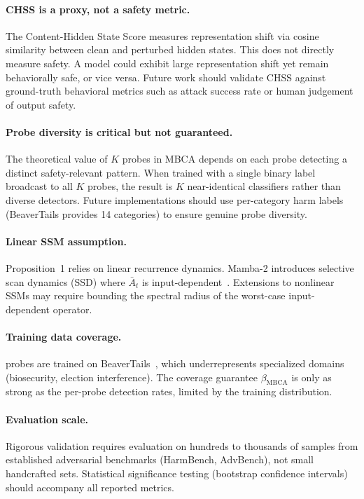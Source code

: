 \documentclass{article}
\newcommand{\MBCA}{\mathrm{MBCA}}
\newcommand{\betaMBCA}{\beta_{\MBCA}}
\begin{document}
\paragraph{CHSS is a proxy, not a safety metric.}
The Content-Hidden State Score measures representation shift via cosine similarity between clean and perturbed hidden states. This does not directly measure safety. A model could exhibit large representation shift yet remain behaviorally safe, or vice versa. Future work should validate CHSS against ground-truth behavioral metrics such as attack success rate or human judgement of output safety.

\paragraph{Probe diversity is critical but not guaranteed.}
The theoretical value of $K$ probes in MBCA depends on each probe detecting a distinct safety-relevant pattern. When trained with a single binary label broadcast to all $K$ probes, the result is $K$ near-identical classifiers rather than diverse detectors. Future implementations should use per-category harm labels (BeaverTails provides 14 categories) to ensure genuine probe diversity.

\paragraph{Linear SSM assumption.}
Proposition~1 relies on linear recurrence dynamics. Mamba-2 introduces selective scan dynamics (SSD) where $\bar{A}_t$ is input-dependent~\cite{dao2024mamba2}. Extensions to nonlinear SSMs may require bounding the spectral radius of the worst-case input-dependent operator.

\paragraph{Training data coverage.}
\MBCA{} probes are trained on BeaverTails~\cite{ji2023beavertails}, which underrepresents specialized domains (biosecurity, election interference). The coverage guarantee $\betaMBCA$ is only as strong as the per-probe detection rates, limited by the training distribution.

\paragraph{Evaluation scale.}
Rigorous validation requires evaluation on hundreds to thousands of samples from established adversarial benchmarks (HarmBench, AdvBench), not small handcrafted sets. Statistical significance testing (bootstrap confidence intervals) should accompany all reported metrics.
\end{document}
